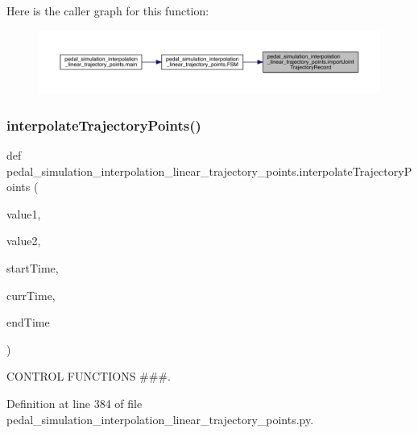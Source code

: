 Here is the caller graph for this function\+:\nopagebreak
\begin{figure}[H]
\begin{center}
\leavevmode
\includegraphics[width=350pt]{namespacepedal__simulation__interpolation__linear__trajectory__points_afa0031bbb7e988157c3978c77909c9f3_icgraph}
\end{center}
\end{figure}
\mbox{\label{namespacepedal__simulation__interpolation__linear__trajectory__points_a566b961b7c78e9a10e7bc0cca3e0c184}} 
\subsubsection{\texorpdfstring{interpolateTrajectoryPoints()}{interpolateTrajectoryPoints()}}
{\footnotesize\ttfamily def pedal\+\_\+simulation\+\_\+interpolation\+\_\+linear\+\_\+trajectory\+\_\+points.\+interpolate\+Trajectory\+Points (\begin{DoxyParamCaption}\item[{}]{value1,  }\item[{}]{value2,  }\item[{}]{start\+Time,  }\item[{}]{curr\+Time,  }\item[{}]{end\+Time }\end{DoxyParamCaption})}



C\+O\+N\+T\+R\+OL F\+U\+N\+C\+T\+I\+O\+NS \#\#\#. 



Definition at line 384 of file pedal\+\_\+simulation\+\_\+interpolation\+\_\+linear\+\_\+trajectory\+\_\+points.\+py.


